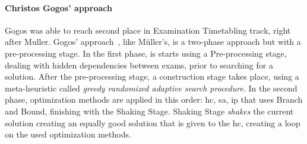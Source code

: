 
\paragraph{Christos Gogos' approach}

Gogos was able to reach second place in Examination Timetabling track, right after Muller. Gogos' approach~\cite{Gogos2012}, like M\"{u}ller's, is a two-phase approach but with a pre-processing stage. In the first phase, is starts using a Pre-processing stage, dealing with hidden dependencies between exams, prior to searching for a solution. After the pre-processing stage, a construction stage takes place, using a meta-heuristic called \textit{greedy randomized adaptive search procedure}. In the second phase, optimization methods are applied in this order: \gls{hc}, \gls{sa}, \gls{ip} that uses Branch and Bound, finishing with the Shaking Stage. Shaking Stage \textit{shakes} the current solution creating an equally good solution that is given to the \gls{hc}, creating a loop on the used optimization methods.\\



